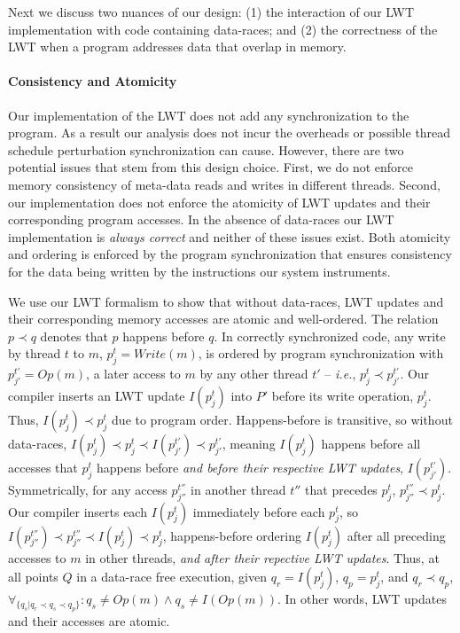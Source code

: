 \documentclass[preprint,9pt]{sigplanconf}
\newcommand{\lwt}{LWT\xspace}
\begin{document}
Next we discuss two nuances of our design: (1) the interaction of our \lwt
implementation with code containing data-races; and (2) the correctness of the
\lwt when a program addresses data that overlap in memory. 

\paragraph{Consistency and Atomicity}

Our implementation of the \lwt does not add any synchronization to the program.
As a result our analysis does not incur the overheads or possible thread
schedule perturbation synchronization can cause.  However, there are two
potential issues that stem from this design choice. First, we do not enforce
memory consistency of meta-data reads and writes in different threads.  Second,
our implementation does not enforce the atomicity of \lwt updates and their
corresponding program accesses.  In the absence of data-races our \lwt
implementation is {\em always correct} and neither of these issues exist.  Both
atomicity and ordering is enforced by the program synchronization that ensures
consistency for the data being written by the instructions our system
instruments.   

We use our \lwt formalism to show that without data-races, \lwt updates and
their corresponding memory accesses are atomic and well-ordered.  The relation
$p \prec q$ denotes that $p$ happens before $q$.  In correctly synchronized
code, any write by thread $t$ to $m$, $p^{t}_{j} = Write(m)$, is ordered by
program synchronization with $p^{t'}_{j'} = Op(m)$, a later access to $m$ by
any other thread $t'$ -- {\em i.e.}, $p^{t}_{j} \prec p^{t'}_{j'}$.  Our
compiler inserts an \lwt update $I(p^{t}_{j})$ into $P'$ before its write
operation, $p^{t}_{j}$. Thus, $I(p^{t}_{j}) \prec p^{t}_{j}$ due to program
order.  Happens-before is transitive, so without data-races, $I(p^{t}_{j})
\prec p^{t}_{j} \prec I(p^{t'}_{j'}) \prec p^{t'}_{j'}$, meaning $I(p^{t}_{j})$
happens before all accesses that $p^{t}_{j}$ happens before {\em and before
their respective \lwt updates}, $I(p^{t'}_{j'})$.  Symmetrically, for any
access $p^{t''}_{j''}$ in another thread $t''$ that precedes $p^{t}_{j}$,
$p^{t''}_{j''} \prec p^{t}_{j}$.  Our compiler inserts each $I(p^{t}_{j})$
immediately before each $p^{t}_{j}$, so $I(p^{t''}_{j''}) \prec p^{t''}_{j''}
\prec I(p^{t}_{j}) \prec p^{t}_{j}$, happens-before ordering $I(p^{t}_{j})$
after all preceding accesses to $m$ in other threads, {\em and after their
repective \lwt updates}.  Thus, at all points $Q$ in a data-race free
execution, given $q_r = I(p^{t}_{j})$, $q_p = p^{t}_{j}$, and $q_r \prec q_p$,
$\forall_{ \{q_s | q_r \prec q_s \prec q_p \}}: q_s \ne Op(m) \wedge q_s \ne
I(Op(m)) $.  In other words, \lwt updates and their accesses are atomic.
\end{document}
